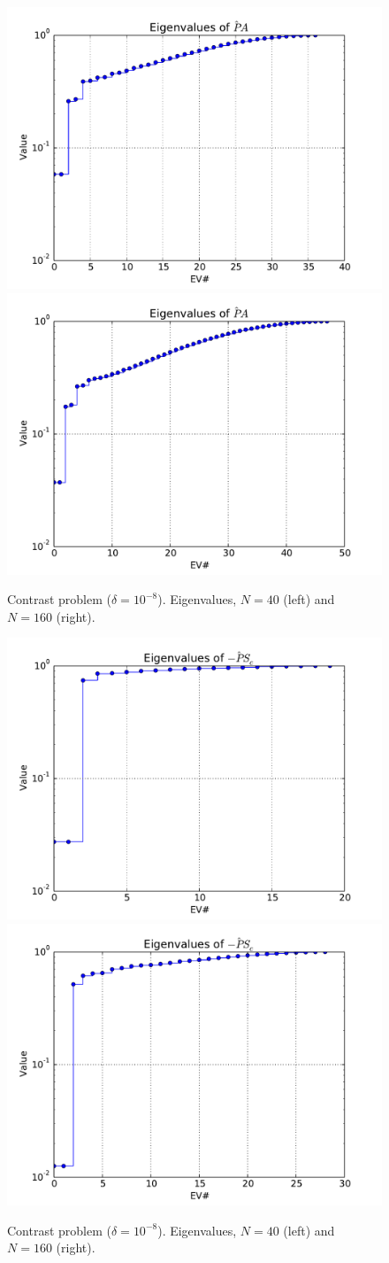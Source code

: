 \documentclass{article}
\begin{document}
\begin{figure}
\begin{center}
\includegraphics[width=0.49\linewidth]{../EV[A],problem=1,exact=0,N=40,cycles=2.pdf}
\includegraphics[width=0.49\linewidth]{../EV[A],problem=1,exact=0,N=160,cycles=2.pdf}
\caption{Contrast problem ($\delta=10^{-8}$). Eigenvalues, $N=40$ (left) and $N=160$ (right).}
\label{contrast-evA}
\end{center}
\end{figure}

\begin{figure}
\begin{center}
\includegraphics[width=0.49\linewidth]{../EV[-S_c],problem=1,exact=0,N=40,cycles=2.pdf}
\includegraphics[width=0.49\linewidth]{../EV[-S_c],problem=1,exact=0,N=160,cycles=2.pdf}
\caption{Contrast problem ($\delta=10^{-8}$). Eigenvalues, $N=40$ (left) and $N=160$ (right).}
\end{center}
\label{contrast-evS}
\end{figure}
\end{document}

